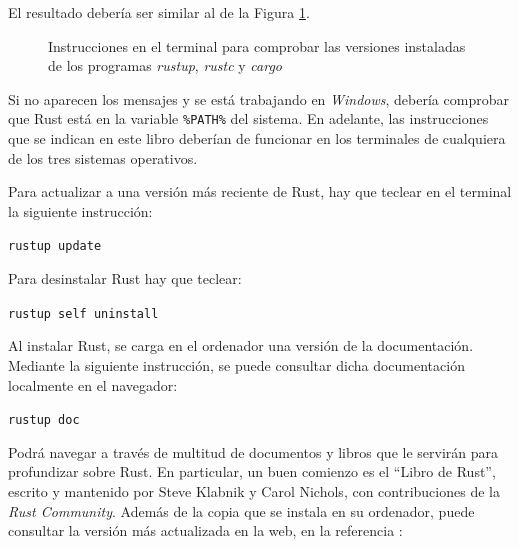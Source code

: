 El resultado debería ser similar al de la Figura \ref{fig_rustup}.

\begin{figure}[H]
   \begin{center}
      \setlength\fboxsep{2pt}
      \setlength\fboxrule{0.5pt}
      \caption{Instrucciones en el terminal para comprobar las versiones instaladas de los programas \textit{rustup}, \textit{rustc} y \textit{cargo}}
      \label{fig_rustup}
   \end{center}
\end{figure}

Si no aparecen los mensajes y se está trabajando en \textit{Windows}, debería comprobar que Rust está en la variable \texttt{\%PATH\%} del sistema. En adelante, las instrucciones que se indican en este libro deberían de funcionar en los terminales de cualquiera de los tres sistemas operativos.

Para actualizar a una versión más reciente de Rust, hay que teclear en el terminal la siguiente instrucción:

{\centering\texttt{rustup update}\par}

Para desinstalar Rust hay que teclear:

{\centering\texttt{rustup self uninstall}\par}

Al instalar Rust, se carga en el ordenador una versión de la documentación. Mediante la siguiente instrucción, se puede consultar dicha documentación localmente en el navegador:

{\centering\texttt{rustup doc}\par}

Podrá navegar a través de multitud de documentos y libros que le servirán para profundizar sobre Rust. En particular, un buen comienzo es el ``Libro de Rust'', escrito y mantenido por Steve Klabnik y Carol Nichols, con contribuciones de la \textit{Rust Community}. Además de la copia que se instala en su ordenador, puede consultar la versión más actualizada en la web, en la referencia \citep{klabnikRustProgrammingLanguage}:

